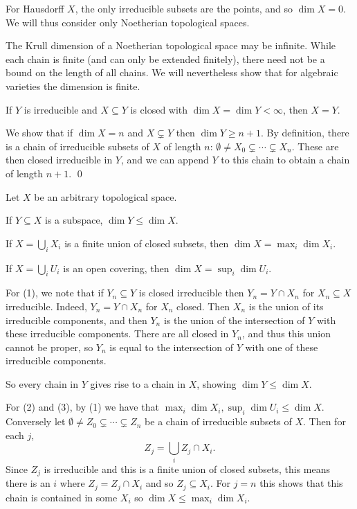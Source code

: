     For Hausdorff $X$, the only irreducible subsets are the points, and so $\dim X=0$.
    We will thus consider only Noetherian topological spaces.

    The Krull dimension of a Noetherian topological space may be infinite.
    While each chain is finite (and can only be extended finitely), there need not be a bound on the length of all chains.
    We will nevertheless show that for algebraic varieties the dimension is finite.

\enote

\blemm

    If $Y$ is irreducible and $X\subseteq Y$ is closed with $\dim X=\dim Y<\infty$, then $X=Y$.

\elemm

\bproof

    We show that if $\dim X=n$ and $X\subsetneq Y$ then $\dim Y\geq n+1$.
    By definition, there is a chain of irreducible subsets of $X$ of length $n$: $\emptyset\neq X_0\subsetneq\cdots\subsetneq X_n$.
    These are then closed irreducible in $Y$, and we can append $Y$ to this chain to obtain a chain of length $n+1$.
    \qed

\eproof

\blemm

    Let $X$ be an arbitrary topological space.
    \benum
        \item If $Y\subseteq X$ is a subspace, $\dim Y\leq\dim X$.
        \item If $X=\bigcup_iX_i$ is a finite union of closed subsets, then $\dim X=\max_i\dim X_i$.
        \item If $X=\bigcup_iU_i$ is an open covering, then $\dim X=\sup_i\dim U_i$.
    \eenum

\elemm

\bproof

    For (1), we note that if $Y_n\subseteq Y$ is closed irreducible then $Y_n=Y\cap X_n$ for $X_n\subseteq X$ irreducible.
    Indeed, $Y_n=Y\cap X_n$ for $X_n$ closed.
    Then $X_n$ is the union of its irreducible components, and then $Y_n$ is the union of the intersection of $Y$ with these irreducible components.
    There are all closed in $Y_n$, and thus this union cannot be proper, so $Y_n$ is equal to the intersection of $Y$ with one of these irreducible components.

    So every chain in $Y$ gives rise to a chain in $X$, showing $\dim Y\leq\dim X$.

    For (2) and (3), by (1) we have that $\max_i\dim X_i,\sup_i\dim U_i\leq\dim X$.
    Conversely let $\emptyset\neq Z_0\subsetneq\cdots\subsetneq Z_n$ be a chain of irreducible subsets of $X$.
    Then for each $j$,
    $$ Z_j = \bigcup_iZ_j\cap X_i . $$
    Since $Z_j$ is irreducible and this is a finite union of closed subsets, this means there is an $i$ where $Z_j=Z_j\cap X_i$ and so $Z_j\subseteq X_i$.
    For $j=n$ this shows that this chain is contained in some $X_i$ so $\dim X\leq\max_i\dim X_i$.

